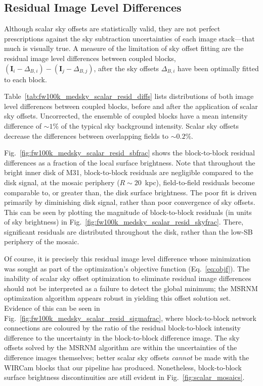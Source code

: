 \documentclass[iop]{emulateapj}
\newcommand{\vect}[1]{\boldsymbol{#1}} %
\newcommand{\Fig}[1]{Fig.~\ref{fig:#1}}  %
\newcommand{\Eq}[1]{Eq.~\ref{eq:#1}}  %
\newcommand{\Tab}[1]{Table~\ref{tab:#1}}  %
\begin{document}
\subsection{Residual Image Level Differences}
\label{sec:residual_diffs}

Although scalar sky offsets are statistically valid, they are not perfect prescriptions against the sky subtraction uncertainties of each image stack---that much is visually true.
A measure of the limitation of sky offset fitting are the residual image level differences between coupled blocks, $(\vect{I}_i - \Delta_{B,i}) - (\vect{I}_j - \Delta_{B,j})$, after the sky offsets $\Delta_{B,i}$ have been optimally fitted to each block.

\Tab{fw100k_medsky_scalar_resid_diffs} lists distributions of both image level differences between coupled blocks, before and after the application of scalar sky offsets.
Uncorrected, the ensemble of coupled blocks have a mean intensity difference of $\sim 1\%$ of the typical sky background intensity.
Scalar sky offsets decrease the differences between overlapping fields to $\sim 0.2\%$.

\Fig{fw100k_medsky_scalar_resid_sbfrac} shows the block-to-block residual differences as a fraction of the local surface brightness.
Note that throughout the bright inner disk of M31, block-to-block residuals are negligible compared to the disk signal, at the mosaic periphery ($R\sim 20$~kpc), field-to-field residuals become comparable to, or greater than, the disk surface brightness.
The poor fit is driven primarily by diminishing disk signal, rather than poor convergence of sky offsets.
This can be seen by plotting the magnitude of block-to-block residuals (in units of sky brightness) in \Fig{fw100k_medsky_scalar_resid_skyfrac}.
There, significant residuals are distributed throughout the disk, rather than the low-SB periphery of the mosaic.

Of course, it is precisely this residual image level difference whose minimization was sought as part of the optimization's objective function (\Eq{objf}).
The inability of scalar sky offset optimization to eliminate residual image differences should not be interpreted as a failure to detect the global minimum; the MSRNM optimization algorithm appears robust in yielding this offset solution set.
Evidence of this can be seen in \Fig{fw100k_medsky_scalar_resid_sigmafrac}, where block-to-block network connections are coloured by the ratio of the residual block-to-block intensity difference to the uncertainty in the block-to-block difference image.
The sky offsets solved by the MSRNM algorithm are within the uncertainties of the difference images themselves; better scalar sky offsets \emph{cannot} be made with the WIRCam blocks that our pipeline has produced.
Nonetheless, block-to-block surface brightness discontinuities are still evident in \Fig{scalar_mosaics}.
\end{document}
